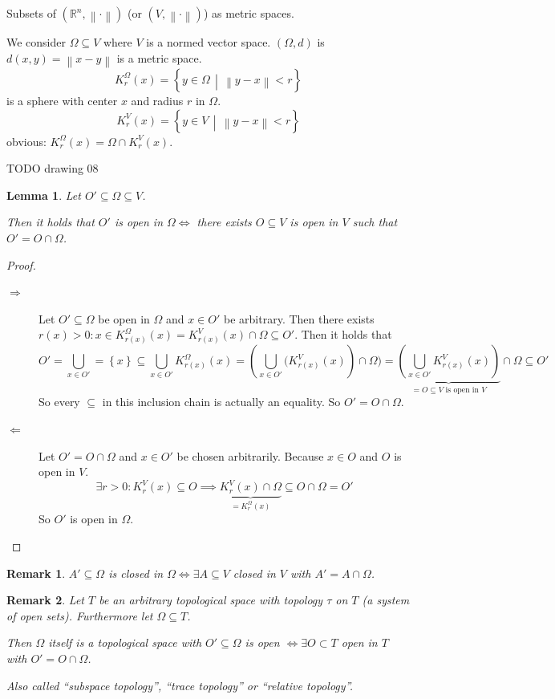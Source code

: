 \documentclass{article}
\newtheorem{lemma}{Lemma}  \numberwithin{lemma}{section}
\newtheorem{remark}{Remark}  \numberwithin{remark}{section}
\newcommand{\set}[1]{\left\{#1\right\}}
\newcommand{\setdef}[2]{\left\{\left.#1\,\middle|\,#2\right.\right\}}
\newcommand{\norm}[1]{\left\|#1\right\|}
\begin{document}
Subsets of $(\mathbb R^n, \norm{\cdot})$ (or $(V, \norm{\cdot})$) as metric spaces.

We consider $\Omega \subseteq V$ where $V$ is a normed vector space.
$(\Omega, d)$ is $d(x, y) = \norm{x - y}$ is a metric space.
\[ K_r^\Omega(x) = \setdef{y \in \Omega}{\norm{y - x} < r} \]
is a sphere with center $x$ and radius $r$ in $\Omega$.
\[ K_r^V(x) = \setdef{y \in V}{\norm{y - x} < r} \]
obvious: $K_r^\Omega(x) = \Omega \cap K_r^V(x)$.

TODO drawing 08

\begin{lemma} %
  Let $O' \subseteq \Omega \subseteq V$.

  Then it holds that $O'$ is open in $\Omega \iff$ there exists $O \subseteq V$ is open in $V$ such that $O' = O \cap \Omega$.
\end{lemma}

\begin{proof}
  \begin{description}
    \item[$\Rightarrow$]
      Let $O' \subseteq \Omega$ be open in $\Omega$ and $x \in O'$ be arbitrary.
      Then there exists $r(x) > 0: x \in K_{r(x)}^\Omega(x) = K_{r(x)}^V(x) \cap \Omega \subseteq O'$.
      Then it holds that
      \[
        O' = \bigcup_{x \in O'} = \set{x} \subseteq \bigcup_{x \in O'} K_{r(x)}^\Omega(x)
        = \left(\bigcup_{x \in O'} (K_{r(x)}^V(x)\right) \cap \Omega)
        = \underbrace{\left(\bigcup_{x \in O'} K_{r(x)}^V(x)\right)}_{= O \subseteq V \text{ is open in } V} \cap \Omega
        \subseteq O'
      \]
      So every $\subseteq$ in this inclusion chain is actually an equality. So $O' = O \cap \Omega$.

    \item[$\Leftarrow$]
      Let $O' = O \cap \Omega$ and $x \in O'$ be chosen arbitrarily.
      Because $x \in O$ and $O$ is open in $V$.
      \[ \exists r > 0: K_r^V(x) \subseteq O \implies \underbrace{K_r^V(x) \cap \Omega}_{= K_r^\Omega(x)} \subseteq O \cap \Omega = O' \]
      So $O'$ is open in $\Omega$.
  \end{description}
\end{proof}

\begin{remark}
  $A' \subseteq \Omega$ is closed in $\Omega \iff \exists A \subseteq V$ closed in $V$ with $A' = A \cap \Omega$.
\end{remark}

\begin{remark}
  Let $T$ be an arbitrary topological space with topology $\tau$ on $T$ (a system of open sets).
  Furthermore let $\Omega \subseteq T$.

  Then $\Omega$ itself is a topological space with $O' \subseteq \Omega$ is open $\iff \exists O \subset T$ open in $T$ with $O' = O \cap \Omega$.

  Also called \enquote{subspace topology}, \enquote{trace topology} or \enquote{relative topology}.
\end{remark}
\end{document}

